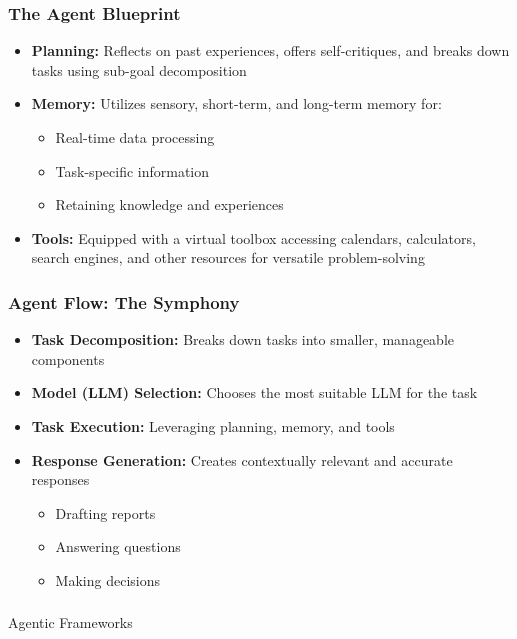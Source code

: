 \begin{frame}[fragile]\frametitle{The Agent Blueprint}
\begin{itemize}
    \item \textbf{Planning:} Reflects on past experiences, offers self-critiques, and breaks down tasks using sub-goal decomposition
    \item \textbf{Memory:} Utilizes sensory, short-term, and long-term memory for:
    \begin{itemize}
        \item Real-time data processing
        \item Task-specific information
        \item Retaining knowledge and experiences
    \end{itemize}
    \item \textbf{Tools:} Equipped with a virtual toolbox accessing calendars, calculators, search engines, and other resources for versatile problem-solving
\end{itemize}
\end{frame}

\begin{frame}[fragile]\frametitle{Agent Flow: The Symphony}
\begin{itemize}
    \item \textbf{Task Decomposition:} Breaks down tasks into smaller, manageable components
    \item \textbf{Model (LLM) Selection:} Chooses the most suitable LLM for the task
    \item \textbf{Task Execution:} Leveraging planning, memory, and tools
    \item \textbf{Response Generation:} Creates contextually relevant and accurate responses
    \begin{itemize}
        \item Drafting reports
        \item Answering questions
        \item Making decisions
    \end{itemize}
\end{itemize}
\end{frame}

\begin{frame}[fragile]\frametitle{}
\begin{center}
{\Large Agentic Frameworks}
\end{center}
\end{frame}

